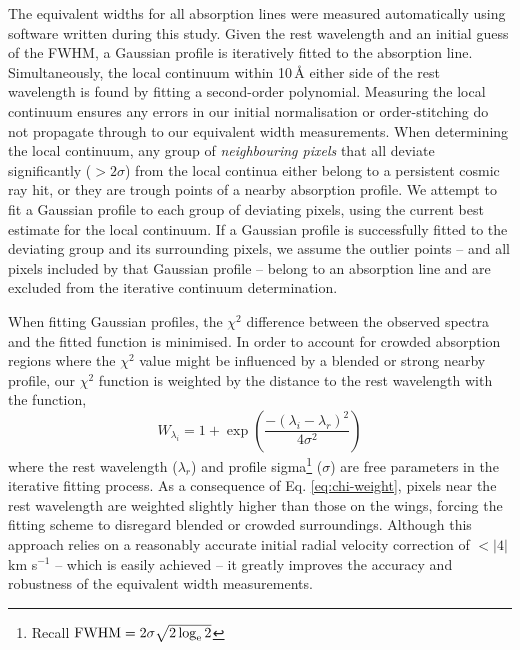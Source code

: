 \documentclass{emulateapj}
\begin{document}
The equivalent widths for all absorption lines were measured automatically using software written during this study. Given the rest wavelength and an initial guess of the FWHM, a Gaussian profile is iteratively fitted to the absorption line. Simultaneously, the local continuum within 10\,\AA{} either side of the rest wavelength is found by fitting a second-order polynomial. Measuring the local continuum ensures any errors in our initial normalisation or order-stitching do not propagate through to our equivalent width measurements. When determining the local continuum, any group of \textit{neighbouring pixels} that all deviate significantly ($>2\sigma$) from the local continua either belong to a persistent cosmic ray hit, or they are trough points of a nearby absorption profile. We attempt to fit a Gaussian profile to each group of deviating pixels, using the current best estimate for the local continuum. If a Gaussian profile is successfully fitted to the deviating group and its surrounding pixels, we assume the outlier points -- and all pixels included by that Gaussian profile -- belong to an absorption line and are excluded from the iterative continuum determination. 

When fitting Gaussian profiles, the $\chi^2$ difference between the observed spectra and the fitted function is minimised. In order to account for crowded absorption regions where the $\chi^2$ value might be influenced by a blended or strong nearby profile, our $\chi^2$ function is weighted by the distance to the rest wavelength with the function,
\begin{equation}
	W_{\lambda_{i}} = 1 + \exp{\left(\frac{-(\lambda_{i} - \lambda_{r})^2}{4\sigma^2}\right)}
\label{eq:chi-weight}
\end{equation}
\noindent where the rest wavelength ($\lambda_{r}$) and profile sigma\footnote{Recall $\rm{FWHM} = 2\sigma\sqrt{2\log_e{2}}$} ($\sigma$) are free parameters in the iterative fitting process. As a consequence of Eq. \ref{eq:chi-weight}, pixels near the rest wavelength are weighted slightly higher than those on the wings, forcing the fitting scheme to disregard blended or crowded surroundings. Although this approach relies on a reasonably accurate initial radial velocity correction of $<|4|$\,km s$^{-1}$ -- which is easily achieved -- it greatly improves the accuracy and robustness of the equivalent width measurements.
\end{document}
